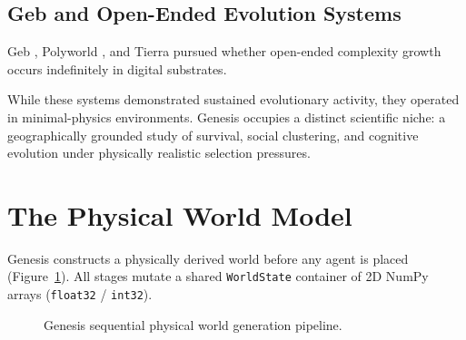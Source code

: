 \documentclass[12pt,a4paper]{article}
\begin{document}
\subsection{Geb and Open-Ended Evolution Systems}

Geb \cite{channon2001}, Polyworld \cite{yaeger1994}, and Tierra \cite{ray1991} pursued whether open-ended complexity growth occurs indefinitely in digital substrates.

While these systems demonstrated sustained evolutionary activity, they operated in minimal-physics environments. Genesis occupies a distinct scientific niche: a geographically grounded study of survival, social clustering, and cognitive evolution under physically realistic selection pressures.

\section{The Physical World Model}

Genesis constructs a physically derived world before any agent is placed (Figure~\ref{fig:world_pipeline}). All stages mutate a shared \texttt{WorldState} container of 2D NumPy arrays (\texttt{float32} / \texttt{int32}).

\begin{figure}[ht]
\centering
{}
\caption{Genesis sequential physical world generation pipeline.}
\label{fig:world_pipeline}
\end{figure}
\end{document}
